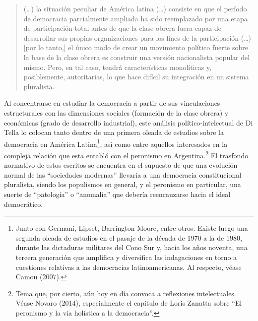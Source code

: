 \begin{quote}
(\ldots) la situación peculiar de América latina (\ldots) consiste en que el período de democracia parcialmente ampliada ha sido reemplazado por una etapa de participación total antes de que la clase obrera fuera capaz de desarrollar sus propias organizaciones para los fines de la participación (\ldots) {[}por lo tanto,{]} el único modo de crear un movimiento político fuerte sobre la base de la clase obrera es construir una versión nacionalista popular del mismo. Pero, en tal caso, tendrá características monolíticas y, posiblemente, autoritarias, lo que hace difícil su integración en un sistema pluralista.
\end{quote}

Al concentrarse en estudiar la democracia a partir de sus vinculaciones estructurales con las dimensiones sociales (formación de la clase obrera) y económicas (grado de desarrollo industrial), este análisis político-intelectual de Di Tella lo colocan tanto dentro de una primera oleada de estudios sobre la democracia en América Latina\footnote{Junto con Germani, Lipset, Barrington Moore, entre otros. Existe luego una segunda oleada de estudios en el pasaje de la década de 1970 a la de 1980, durante las dictaduras militares del Cono Sur y, hacia los años noventa, una tercera generación que amplifica y diversifica las indagaciones en torno a cuestiones relativas a las democracias latinoamericanas. Al respecto, véase Camou (2007).}, así como entre aquellos interesados en la compleja relación que esta entabló con el peronismo en Argentina.\footnote{Tema que, por cierto, aún hoy en día convoca a reflexiones intelectuales. Véase Novaro (2014), especialmente el capítulo de Loris Zanatta sobre ``El peronismo y la vía holística a la democracia''.} El trasfondo normativo de estos escritos se encuentra en el supuesto de que una evolución normal de las ``sociedades modernas'' llevaría a una democracia constitucional pluralista, siendo los populismos en general, y el peronismo en particular, una suerte de ``patología'' o ``anomalía'' que debería reencauzarse hacia el ideal democrático.

